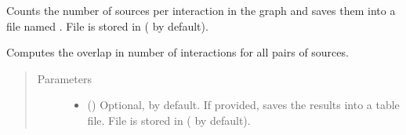 \documentclass[letterpaper,10pt,english]{sphinxmanual}
\begin{document}
\begin{fulllineitems}
\begin{fulllineitems}
\begin{quote}
\begin{description}
\end{description}\end{quote}

\end{fulllineitems}


\begin{fulllineitems}
\label{\detokenize{main:pypath.main.PyPath.source_stats}}
\end{fulllineitems}


\begin{fulllineitems}
\label{\detokenize{main:pypath.main.PyPath.sources_hist}}
Counts the number of sources per interaction in the graph and
saves them into a file named . File is stored in
 ( by
default).

\end{fulllineitems}


\begin{fulllineitems}
\label{\detokenize{main:pypath.main.PyPath.sources_overlap}}
\end{fulllineitems}


\begin{fulllineitems}
\label{\detokenize{main:pypath.main.PyPath.sources_venn_data}}
Computes the overlap in number of interactions for all pairs of
sources.
\begin{quote}\begin{description}
\item[{Parameters}] \leavevmode\begin{itemize}
\item {} 
 () \textendash{} Optional,  by default. If provided, saves the
results into a table file. File is stored in
 ( by
default).


\end{itemize}
\end{description}
\end{quote}
\end{fulllineitems}
\end{fulllineitems}
\end{document}
